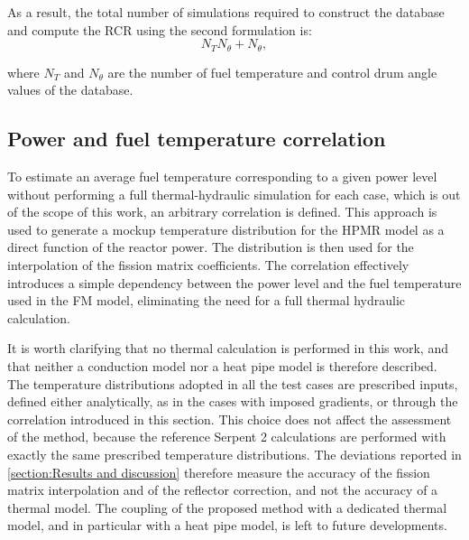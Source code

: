 \documentclass[preprint,review,12pt]{elsarticle}
\newif\ifhighlight
\newcommand{\rthree}[1]{\ifhighlight\textcolor{revthree}{#1}\else#1\fi}
\begin{document}
As a result, the total number of simulations required to construct the database and compute the RCR using the second formulation is:
\begin{equation}
    N_T N_{\theta} + N_{\theta},
\end{equation}

where $N_T$ and $N_{\theta}$ are the number of fuel temperature and control drum angle values of the database.



\subsection{Power and fuel temperature correlation}
\label{subsec:Power and fuel temperature correlation}
To estimate an average fuel temperature corresponding to a given power level without performing a full thermal-hydraulic simulation for each case, which is out of the scope of this work, an arbitrary correlation is defined. This approach is used to generate a mockup temperature distribution for the HPMR model as a direct function of the reactor power. The distribution is then used for the interpolation of the fission matrix coefficients. The correlation effectively introduces a simple dependency between the power level and the fuel temperature used in the FM model, eliminating the need for a full thermal hydraulic calculation.

\rthree{It is worth clarifying that no thermal calculation is performed in this work, and that neither a conduction model nor a heat pipe model is therefore described. The temperature distributions adopted in all the test cases are prescribed inputs, defined either analytically, as in the cases with imposed gradients, or through the correlation introduced in this section. This choice does not affect the assessment of the method, because the reference Serpent 2 calculations are performed with exactly the same prescribed temperature distributions. The deviations reported in \cref{section:Results and discussion} therefore measure the accuracy of the fission matrix interpolation and of the reflector correction, and not the accuracy of a thermal model. The coupling of the proposed method with a dedicated thermal model, and in particular with a heat pipe model, is left to future developments.}
\end{document}
